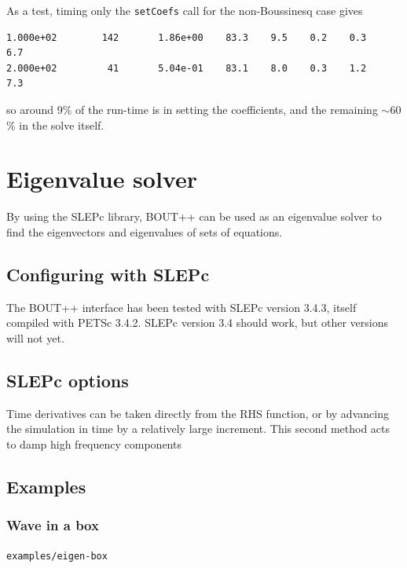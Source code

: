 \documentclass[12pt]{article}
\begin{document}
As a test, timing only the \texttt{setCoefs} call for the non-Boussinesq case
gives
%
\begin{verbatim}
1.000e+02        142       1.86e+00    83.3    9.5    0.2    0.3    6.7
2.000e+02         41       5.04e-01    83.1    8.0    0.3    1.2    7.3
\end{verbatim}
%
so around 9\% of the run-time is in setting the coefficients, and the remaining
$\sim 60$\% in the solve itself.





\section{Eigenvalue solver}
%
By using the SLEPc library, BOUT++ can be used as an eigenvalue solver to find
the eigenvectors and eigenvalues of sets of equations.



\subsection{Configuring with SLEPc}
%
The BOUT++ interface has been tested with SLEPc version 3.4.3, itself compiled
with PETSc 3.4.2. SLEPc version 3.4 should work, but other versions will not
yet.



\subsection{SLEPc options}
%
Time derivatives can be taken directly from the RHS function, or by advancing
the simulation in time by a relatively large increment.  This second method
acts to damp high frequency components



\subsection{Examples}
%


\subsubsection{Wave in a box}
%
\texttt{examples/eigen-box}
\end{document}
